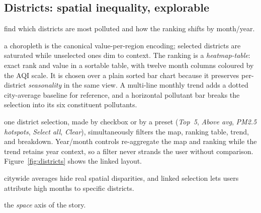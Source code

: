 \documentclass[a4paper]{article}
\newenvironment{designnotes}
  {\begin{description}[leftmargin=0pt, itemsep=2pt, parsep=1pt, topsep=3pt, style=unboxed, font=\normalfont\bfseries]}
  {\end{description}}
\begin{document}
\subsection{Districts: spatial inequality, explorable}
\begin{designnotes}
\item[User goal:] find which districts are most polluted and how the ranking shifts by month/year.
\item[Encodings \& rationale:] a choropleth is the canonical value-per-region encoding; selected
districts are saturated while unselected ones dim to context. The ranking is a \emph{heatmap-table}:
exact rank and value in a sortable table, with twelve month columns coloured by the AQI scale. It is chosen
over a plain sorted bar chart because it preserves per-district \emph{seasonality} in the same view. A
multi-line monthly trend adds a dotted city-average baseline for reference, and a horizontal pollutant bar
breaks the selection into its six constituent pollutants.
\item[Interaction (the strongest coordinated-views story):] one district selection, made by checkbox
or by a preset (\textit{Top~5}, \textit{Above avg}, \textit{PM2.5 hotspots}, \textit{Select all},
\textit{Clear}), simultaneously filters the map, ranking table, trend, and breakdown. Year/month
controls re-aggregate the map and ranking while the trend retains year context, so a filter never strands
the user without comparison. Figure~\ref{fig:districts} shows the linked layout.
\item[Key insight:] citywide averages hide real spatial disparities, and linked selection lets users
attribute high months to specific districts.
\item[Narrative link:] the \emph{space} axis of the story.
\end{designnotes}

\end{document}
